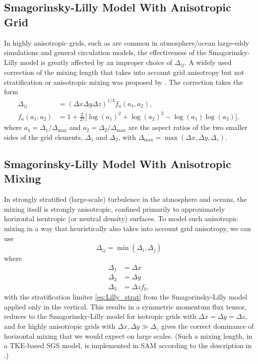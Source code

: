 \documentclass{report}
\begin{document}
\subsection{Smagorinsky-Lilly Model With Anisotropic Grid}
 
In highly anisotropic grids, such as are common in atmosphere/ocean large-eddy simulations and general circulation models, the effectiveness of the Smagorinsky-Lilly model is greatly affected by an improper choice of $\Delta_{ij}$. A widely used correction of the mixing length that takes into account grid anisotropy but not stratification or anisotropic mixing was proposed by  \citet{scottiMeneveauLilly1993}. The correction takes the form
\begin{align}
\Delta_{ij} &= (\Delta x \Delta y \Delta z)^{1/3} f_{a}(a_1, a_2),   \\
f_a(a_1, a_2) &= 1+\frac{2}{27}\Big[\log(a_{1})^2 + \log(a_2)^2 -\log(a_1)\log(a_2)\Big],
\end{align}
where  $a_1 =  \Delta_1/\Delta_{\max}$ and $a_2 = \Delta_2/\Delta_{\max}$ are the aspect ratios of the two smaller sides of the grid elements, $\Delta_1$ and $\Delta_2$, with $\Delta_{\max} = \max(\Delta x, \Delta y, \Delta_z)$. 

\subsection{Smagorinsky-Lilly Model With Anisotropic Mixing}\label{s:anisotropic_SGS_mixing}

In strongly stratified (large-scale) turbulence in the atmosphere and oceans, the mixing itself is strongly anisotropic, confined primarily to approximately horizontal isentropic (or neutral density) surfaces. To model such anisotropic mixing in a way that heuristically also takes into account grid anisotropy, we can use 
\begin{equation}
\Delta_{ij} = \min(\Delta_i, \Delta_j)  
\end{equation}
where 
\begin{align}
\Delta_1 & = \Delta x \\
\Delta_2 & = \Delta y \\
\Delta_3 & = \Delta z f_b,
\end{align}
with the stratification limiter \eqref{eq:Lilly_strat} from the Smagorinsky-Lilly model applied only in the vertical. This results in a symmetric momentum flux tensor, reduces to the Smagorinsky-Lilly model for isotropic grids with $\Delta x = \Delta y = \Delta z$, and for highly anisotropic grids with $\Delta x, \Delta y \gg \Delta_z$ gives the correct dominance of horizontal mixing that we would expect on large scales. (Such a mixing length, in a TKE-based SGS model, is implemented in SAM according to the description in \citet{Stevens05a}.) 
\end{document}
